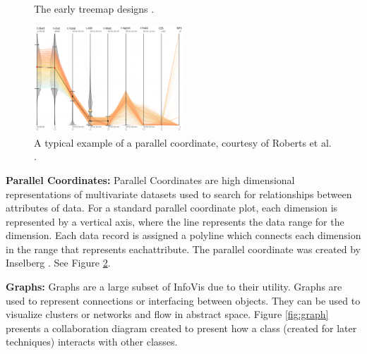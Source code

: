 \begin{figure}[b]
~
\caption{The early treemap designs \cite{johnson1991tree}. } \label{fig:treemap}
\end{figure}

\begin{figure}[t]
\centering
\includegraphics[width=0.5\textwidth]{images/ch1/pc2}
\caption{A typical example of a parallel coordinate, courtesy of Roberts et al. \cite{roberts2018smart}. } \label{fig:pc}
\end{figure}
\noindent
\textbf{Parallel Coordinates: } Parallel Coordinates are high dimensional representations of multivariate datasets used to search for relationships between attributes of data. For a standard parallel coordinate plot, each dimension is represented by a vertical axis, where the line represents the data range for the dimension. Each data record is assigned a polyline which connects each dimension in the range that represents eachattribute. The parallel coordinate was created by Inselberg \cite{inselberg1985plane}. See Figure \ref{fig:pc}.

\noindent
\textbf{Graphs: } Graphs are a large subset of InfoVis due to their utility. Graphs are used to represent connections or interfacing between objects. They can be used to visualize clusters or networks and flow in abstract space. Figure \ref{fig:graph} presents a collaboration diagram created to present how a class (created for later techniques) interacts with other classes. 

